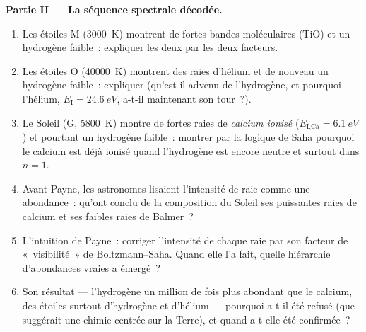 \begin{problem}
\medskip\noindent\textbf{Partie II --- La séquence spectrale
décodée.}
\begin{enumerate}[resume]
  \item Les étoiles M (\qty{3000}{K}) montrent de fortes bandes
        moléculaires (TiO) et un hydrogène faible~: expliquer les deux
        par les deux facteurs.
  \item Les étoiles O (\qty{40000}{K}) montrent des raies d'hélium et
        de nouveau un hydrogène faible~: expliquer (qu'est-il advenu
        de l'hydrogène, et pourquoi l'hélium,
        $E_{\text{I}} = \qty{24.6}{eV}$, a-t-il maintenant son tour~?).
  \item Le Soleil (G, \qty{5800}{K}) montre de fortes raies de
        \emph{calcium ionisé} ($E_{\text{I,Ca}} = \qty{6.1}{eV}$) et
        pourtant un hydrogène faible~: montrer par la logique de Saha
        pourquoi le calcium est déjà ionisé quand l'hydrogène est
        encore neutre et surtout dans $n = 1$.
  \item Avant Payne, les astronomes lisaient l'intensité de raie comme
        une abondance~: qu'ont conclu de la composition du Soleil ses
        puissantes raies de calcium et ses faibles raies de Balmer~?
  \item L'intuition de Payne~: corriger l'intensité de chaque raie par
        son facteur de «~visibilité~» de Boltzmann--Saha. Quand elle
        l'a fait, quelle hiérarchie d'abondances vraies a émergé~?
  \item Son résultat --- l'hydrogène un million de fois plus abondant
        que le calcium, des étoiles surtout d'hydrogène et d'hélium
        --- pourquoi a-t-il été refusé (que suggérait une chimie
        centrée sur la Terre), et quand a-t-elle été confirmée~?
\end{enumerate}


\end{problem}

